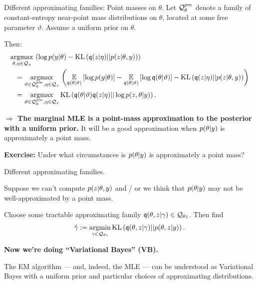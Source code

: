 \begin{frame}{Different approximating families: Point masses on $\theta$.}
%
Let $\mathcal{Q}_{\theta}^{pm}$ denote a family of constant-entropy near-point mass
distributions on $\theta$, located at some free parameter $\vartheta$. Assume a
uniform prior on $\theta$.

\pause

Then:
%
\begin{align*}
%
\MoveEqLeft
\argmax{\theta, \eta \in \qdom_\z}
\left(
\log p(\y | \theta) -
    \kl{\q(\z | \eta)}{p(\z | \theta, \y)}  \right)
\\={}&
%
\argmax{\vartheta \in \qdom_{\theta}^{pm}, \eta \in \qdom_\z}
\left(
\expect{\q(\theta \vert \vartheta)}{\log p(\y | \theta)} -
\expect{\q(\theta \vert \vartheta)}{\log \q(\theta | \vartheta)} -
    \kl{\q(\z | \eta)}{p(\z | \theta, \y)}
\right)
\\={}&
\argmax{\vartheta \in \qdom_{\theta}^{pm}, \eta \in \qdom_\z}
\kl{\q(\theta \vert \vartheta) \q(\z \vert \eta)}{\log p(\z, \theta \vert \y)}.
%
\end{align*}
%

\pause

\textbf{
$\Rightarrow$ The marginal MLE is a point-mass approximation to the
posterior with a uniform prior.}
%
It will be a good approximation when $p(\theta \vert y)$ is approximately a
point mass.

\pause

\textbf{Exercise: } Under what circumstances is $p(\theta \vert y)$ is
approximately a point mass?

\end{frame}




\begin{frame}{Different approximating families.}

Suppose we can't compute $p(z | \theta, y)$ and / or we think that
$p(\theta \vert y)$ may not be well-approximated by a point mass.

Choose some tractable approximating family $\mathfrak{q}(\theta, z \vert \gamma) \in
\mathcal{Q}_{\theta z}$.  Then find
%
\begin{align*}
%
\hat\gamma := \argmin{\gamma \in \qdom_{\theta\z}}
\kl{\q(\theta, \z \vert \gamma)}{p(\theta, \z \vert \y)}.
%
\end{align*}
%
\pause

\textbf{Now we're doing ``Variational Bayes'' (VB).}

\pause

The EM algorithm --- and, indeed, the MLE --- can be understood as Variational
Bayes with a uniform prior and particular choices of approximating
distributions.

\end{frame}


